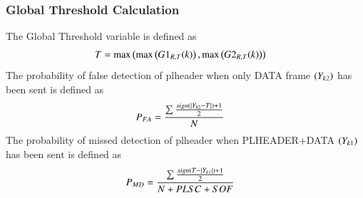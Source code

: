 \subsubsection{Global Threshold Calculation}
The Global Threshold variable is defined as
\begin{align}
T&= \max \left( \max \left(G1_{R,T}(k)\right),\max \left( G2_{R,T}(k)\right)\right)
\end{align} 
The probability of false detection of plheader when only DATA frame $\left(Y_{k2}\right)$ has been sent is defined as
\begin{align}
P_{FA} &= \frac{\sum \frac{sign(\left\vert Y_{k2}-T\right\vert)+1}{2} }{N}
\end{align}
The probability of missed detection of plheader when PLHEADER+DATA $\left(Y_{k1}\right)$ has been sent is defined as
\begin{align}
P_{MD} &= \frac{\sum \frac{sign(T-\left\vert Y_{k1}\right\vert)+1}{2} }{N+PLSC+SOF}
\end{align}
